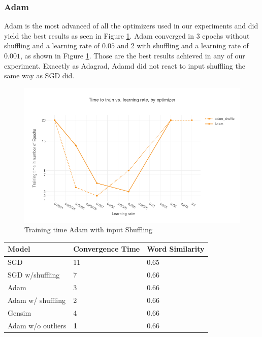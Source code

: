 \subsubsection{Adam}
Adam is the most advanced of all the optimizers used in our experiments and did yield the best results as seen in Figure \ref{fig:results_adam_shuffle}. Adam converged in 3 epochs without shuffling and a learning rate of $0.05$ and 2 with shuffling and a learning rate of $0.001$, as shown in Figure \ref{fig:results_adam_shuffle}. Those are the best results achieved in any of our experiment. Exacctly as Adagrad, Adamd did not react to input shuffling the same way as SGD did.
\begin{figure}[h]
    \centering
            \includegraphics[scale=0.3]{images/results_adam_shuffle} 
    \caption{Training time Adam with input Shuffling}
    \label{fig:results_adam_shuffle}
\end{figure}

    \begin{table}[]
\begin{tabular}{|l|l|l|}
\hline
Model    & Convergence Time & Word Similarity \\ \hline
SGD & {11}              & 0.65            \\ \hline
SGD w/shuffling & {7}              & 0.66            \\ \hline
Adam & {3}              & 0.66            \\ \hline
Adam w/ shuffling & {2}              & 0.66      \\ \hline
Gensim   & 4          & 0.66            \\ \hline
Adam w/o outliers  & \textbf{1} & 0.66 \\ \hline
\end{tabular}
\end{table}